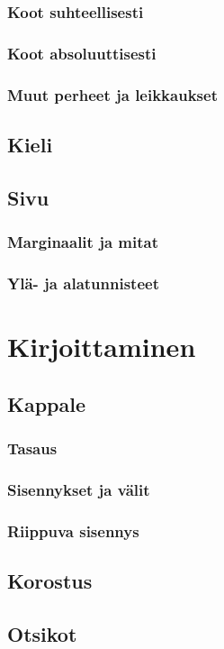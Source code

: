 \documentclass[a4paper,10pt,notitlepage,oneside]{book}
\begin{document}
\subsection{Koot suhteellisesti}
\label{luku:fontti_suhteellinen}
\subsection{Koot absoluuttisesti}
\label{luku:fontti_absoluuttinen}
\subsection{Muut perheet ja leikkaukset}
\section{Kieli}
\label{luku:kieliasetukset}
\section{Sivu}
\label{luku:sivuasetukset}
\subsection{Marginaalit ja mitat}
\subsection{Ylä- ja alatunnisteet}

\chapter{Kirjoittaminen}
\section{Kappale}
\subsection{Tasaus}
\subsection{Sisennykset ja välit}
\subsection{Riippuva sisennys}
\section{Korostus}
\section{Otsikot}
\end{document}
